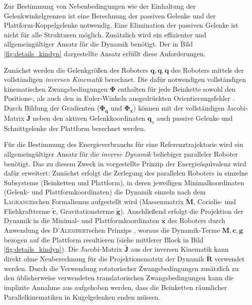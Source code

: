 \documentclass[fleqn,a4paper,10pt]{article}
\newcommand{\bm}[1]{\mathbf{#1}}
\renewcommand{\Phi}[1]{\varPhi{#1}}
\renewenvironment{figure}
  {\par\vspace{6pt}\noindent\minipage{\linewidth}}
  {\endminipage\par\vspace{6pt}}
\begin{document}
Zur Bestimmung von Nebenbedingungen wie der Einhaltung der Gelenkwinkelgrenzen ist eine Berechnung der passiven Gelenke und der Plattform-Koppelgelenke notwendig.
Eine Elimination der passiven Gelenke ist nicht für alle Strukturen möglich.
Zusätzlich wird ein effizienter und allgemeingültiger Ansatz für die Dynamik benötigt.
Der in Bild\,\ref{fig:details_kindyn} dargestellte Ansatz erfüllt diese Anforderungen.

\begin{figure}
    \centering
    
    \label{fig:details_kindyn}
\end{figure}

Zunächst werden die Gelenkgrößen des Roboters $\bm{q},\dot{\bm{q}},\ddot{\bm{q}}$ des Roboters mittels der vollständigen \emph{inversen Kinematik} \cite{SchapplerTapOrt2019c} berechnet.
Die dafür notwendigen vollständigen kinematischen Zwangsbedingungen $\bm{\Phi}$ enthalten für jede Beinkette sowohl den Positions-, als auch den in Euler-Winkeln ausgedrückten Orientierungsfehler \cite{SchapplerTapOrt2019c}.
Durch Bildung der Gradienten ($\bm{\Phi}_\bm{q}$ und $\bm{\Phi}_\bm{x}$) können mit der vollständigen Jacobi-Matrix $\tilde{\bm{J}}$ neben den aktiven Gelenkkoordinaten $\bm{q}_\mathrm{a}$ auch passive Gelenke und Schnittgelenke der Plattform berechnet werden.

Für die Bestimmung des Energieverbrauchs für eine Referenztrajektorie wird ein allgemeingültiger Ansatz für die \emph{inverse Dynamik} beliebiger paralleler Roboter benötigt.
Das zu diesem Zweck in \cite{AbdellatifHei2009,DoThanhKotHeiOrt2009b} vorgestellte Prinzip der Energieäquivalenz wird dafür erweitert:
Zunächst erfolgt die Zerlegung des parallelen Roboters in einzelne Subsysteme (Beinketten und Plattform), in deren jeweiligen Minimalkoordinaten (Gelenk- und Plattformkoordinaten) die Dynamik einzeln nach dem \textsc{Lagrange}schen Formalismus aufgestellt wird (Massenmatrix $\tilde{\bm{M}}$, Coriolis- und Fliehkraftterme $\tilde{\bm{c}}$, Gravitationsterme $\tilde{\bm{g}}$).
Anschließend erfolgt die Projektion der Dynamik in die Minimal- und Plattformkoordinaten $\bm{x}$ des Roboters durch Anwendung des \textsc{D'Alembert}schen Prinzips \cite{DoThanhKotHeiOrt2009b,AbdellatifHei2009}, woraus die Dynamik-Terme $\bm{M},\bm{c},\bm{g}$ bezogen auf die Plattform resultieren (siehe mittlerer Block in Bild\,\ref{fig:details_kindyn}).
Die Jacobi-Matrix $\tilde{\bm{J}}$ aus der inversen Kinematik kann direkt ohne Neuberechnung für die Projektionsmatrix der Dynamik $\tilde{\bm{R}}$ verwendet werden.
Durch die Verwendung rotatorischer Zwangsbedingungen zusätzlich zu den üblicherweise verwendeten translatorischen Zwangsbedingungen kann die implizite Annahme aus \cite{AbdellatifHei2009} aufgehoben werden, dass die Beinketten räumlicher Parallelkinematiken in Kugelgelenken enden müssen.
\end{document}
